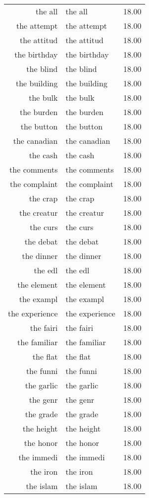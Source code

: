 \begin{table}[ht]
\begin{tabular}{rlr}
  the all & the all & 18.00 \\ 
  the attempt & the attempt & 18.00 \\ 
  the attitud & the attitud & 18.00 \\ 
  the birthday & the birthday & 18.00 \\ 
  the blind & the blind & 18.00 \\ 
  the building & the building & 18.00 \\ 
  the bulk & the bulk & 18.00 \\ 
  the burden & the burden & 18.00 \\ 
  the button & the button & 18.00 \\ 
  the canadian & the canadian & 18.00 \\ 
  the cash & the cash & 18.00 \\ 
  the comments & the comments & 18.00 \\ 
  the complaint & the complaint & 18.00 \\ 
  the crap & the crap & 18.00 \\ 
  the creatur & the creatur & 18.00 \\ 
  the curs & the curs & 18.00 \\ 
  the debat & the debat & 18.00 \\ 
  the dinner & the dinner & 18.00 \\ 
  the edl & the edl & 18.00 \\ 
  the element & the element & 18.00 \\ 
  the exampl & the exampl & 18.00 \\ 
  the experience & the experience & 18.00 \\ 
  the fairi & the fairi & 18.00 \\ 
  the familiar & the familiar & 18.00 \\ 
  the flat & the flat & 18.00 \\ 
  the funni & the funni & 18.00 \\ 
  the garlic & the garlic & 18.00 \\ 
  the genr & the genr & 18.00 \\ 
  the grade & the grade & 18.00 \\ 
  the height & the height & 18.00 \\ 
  the honor & the honor & 18.00 \\ 
  the immedi & the immedi & 18.00 \\ 
  the iron & the iron & 18.00 \\ 
  the islam & the islam & 18.00 \\ 

\end{tabular}
\end{table}
